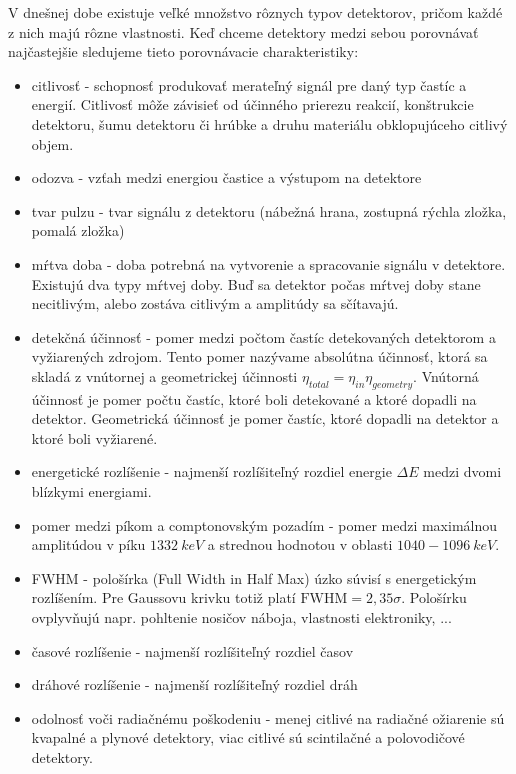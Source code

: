\documentclass[../../main.tex]{subfiles}
\begin{document}
V dnešnej dobe existuje veľké množstvo rôznych typov detektorov, pričom každé z nich majú rôzne vlastnosti. Keď chceme detektory medzi sebou porovnávať najčastejšie sledujeme tieto porovnávacie charakteristiky:
\begin{itemize}
\item citlivosť - schopnosť produkovať merateľný signál pre daný typ častíc a energií. Citlivosť môže závisieť od účinného prierezu reakcií, konštrukcie detektoru, šumu detektoru či hrúbke a druhu materiálu obklopujúceho citlivý objem.
\item odozva - vzťah medzi energiou častice a výstupom na detektore
\item tvar pulzu - tvar signálu z detektoru (nábežná hrana, zostupná rýchla zložka, pomalá zložka)
\item mŕtva doba - doba potrebná na vytvorenie a spracovanie signálu v detektore. Existujú dva typy mŕtvej doby. Buď sa detektor počas mŕtvej doby stane necitlivým, alebo zostáva citlivým a amplitúdy sa sčítavajú.
\item detekčná účinnosť - pomer medzi počtom častíc detekovaných detektorom a vyžiarených zdrojom. Tento pomer nazývame absolútna účinnosť, ktorá sa skladá z vnútornej a geometrickej účinnosti $\eta_{total}=\eta_{in}\eta_{geometry}$. Vnútorná účinnosť je pomer počtu častíc, ktoré boli detekované a ktoré dopadli na detektor. Geometrická účinnosť je pomer častíc, ktoré dopadli na detektor a ktoré boli vyžiarené.
\item energetické rozlíšenie - najmenší rozlíšiteľný rozdiel energie $\Delta E$ medzi dvomi blízkymi energiami.
\item pomer medzi píkom a comptonovským pozadím - pomer medzi maximálnou amplitúdou v píku $1332\:\unit{keV}$ a strednou hodnotou v oblasti $1040-1096\:\unit{keV}$.
\item FWHM - pološírka (Full Width in Half Max) úzko súvisí s energetickým rozlíšením. Pre Gaussovu krivku totiž platí $\mathrm{FWHM}=2,35\sigma$. Pološírku ovplyvňujú napr. pohltenie nosičov náboja, vlastnosti elektroniky, ...
\item časové rozlíšenie - najmenší rozlíšiteľný rozdiel časov
\item dráhové rozlíšenie - najmenší rozlíšiteľný rozdiel dráh
\item odolnosť voči radiačnému poškodeniu - menej citlivé na radiačné ožiarenie sú kvapalné a plynové detektory, viac citlivé sú scintilačné a polovodičové detektory. 
\end{itemize}
\end{document}
